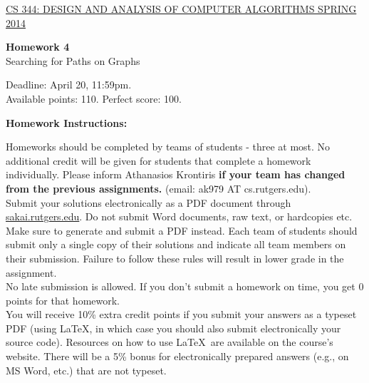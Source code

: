 \documentclass{article}
\begin{document}
\sloppy

\noindent \underline{CS 344: DESIGN AND ANALYSIS OF COMPUTER
  ALGORITHMS \hspace{1.6in} SPRING 2014}

\vspace{0.1in}

\begin{center}
{\bf {\large Homework 4}}\\
Searching for Paths on Graphs\\
\end{center}

\vspace{0.1in}

\noindent Deadline: April 20, 11:59pm.\\ 
Available points: 110. Perfect score: 100.\\

\begin{center}
{\bf Homework Instructions:}
\end{center}

 Homeworks should be completed by teams of
students - three at most. No additional credit will be given for
students that complete a homework individually. Please inform
Athanasios Krontiris {\bf if your team has changed from the previous
  assignments.} (email: ak979 AT cs.rutgers.edu).\\

 Submit your solutions electronically
as a PDF document through \url{sakai.rutgers.edu}. Do not submit Word
documents, raw text, or hardcopies etc. Make sure to generate and
submit a PDF instead. Each team of students should submit only a
single copy of their solutions and indicate all team members on their
submission.  Failure to follow these rules will result in lower grade
in the assignment.\\

 No late submission is allowed. If
you don't submit a homework on time, you get 0 points for that
homework.\\

 You will receive 10\% extra
credit points if you submit your answers as a typeset PDF (using
\LaTeX, in which case you should also submit electronically your
source code). Resources on how to use \LaTeX\ are available on the
course's website. There will be a 5\% bonus for electronically
prepared answers (e.g., on MS Word, etc.) that are not typeset.\\
\end{document}
